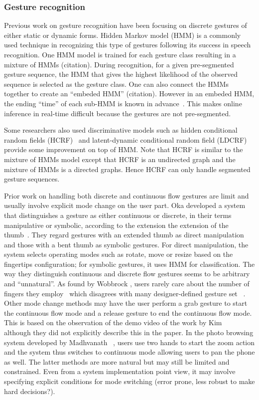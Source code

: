 \documentclass[10pt,twocolumn,letterpaper]{article}
\begin{document}
\subsubsection{Gesture recognition}
Previous work on gesture recognition have been focusing on discrete gestures of either
static or dynamic forms. Hidden Markov model (HMM) is a commonly used technique
in recognizing this type of gestures following its success in speech recognition. 
One HMM model is trained for each gesture class resulting in a mixture of HMMs (citation). During
recognition, for a given pre-segmented gesture sequence, the HMM that gives the highest
likelihood of the observed sequence is selected as the gesture class. One can also
connect the HMMs together to create an ``embeded HMM'' (citation). However in an
embeded HMM, the ending ``time'' of each sub-HMM is known in advance~\cite{murphy02}.
This makes online inference in real-time difficult because the gestures are not
pre-segmented. 

Some researchers also used discriminative models such as hidden conditional 
random fields (HCRF)~\cite{wang06} and latent-dynamic conditional random field (LDCRF)~\cite{morency07} provide some 
improvement on top of HMM. Note that HCRF is similar to the mixture of HMMs model except that
HCRF is an undirected graph and the mixture of HMMs is a directed graphs. Hence HCRF
can only handle segmented gesture sequences.

Prior work on handling both discrete and continuous flow gestures are limit and 
usually involve explicit mode change on the user part. Oka \etal developed a 
system that distinguishes a gesture as either continuous or discrete, in their 
terms manipulative or symbolic, according to the extension the extension of the 
thumb~\cite{Oka02}. They regard gestures with an extended thumb as direct manipulation
and those with a bent thumb as symbolic gestures. For direct manipulation, the
system selects operating modes such as rotate, move or resize based on the fingertips
configuration; for symbolic gestures, it uses HMM for classification. The way they
distinguish continuous and discrete flow gestures seems to be arbitrary and ``unnatural''.
As found by Wobbrock \etal, users rarely care about the number of fingers they 
employ~\cite{Wobbrock09} which disagrees with many designer-defined gesture set
~\cite{Malik05, Morris06, Rekimoto02, Tse06}. Other mode change methods may have the
user perform a grab gesture to start the continuous flow mode and a release gesture
to end the continuous flow mode. This is based on the observation of the demo video
of the work by Kim \etal~\cite{Kim12} although they did not explicitly describe this
in the paper. In the photo browsing system developed by Madhvanath \etal~\cite{Madhvanath12},
users use two hands to start the zoom action and the system thus switches to continuous
mode allowing users to pan the phone as well. The latter methods are more natural but may still
be limited and constrained. Even from a system implementation point view, it may 
involve specifying explicit conditions for mode switching (error prone, less robust
to make hard decisions?).   
\end{document}
